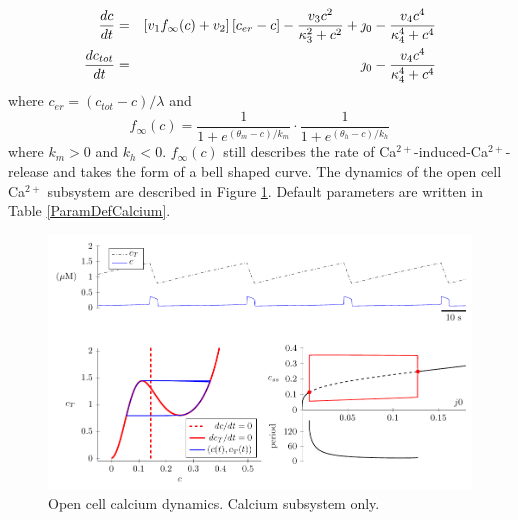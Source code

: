 \documentclass[12pt]{article}
\def\ca{Ca$^{2+}$\xspace}
\def\ctot{c_{tot}}
\def\cer{c_{er}}
\def\finf{f_\infty}
\def\thetam{\theta_m}
\def\km{k_m}
\def\thetah{\theta_h}
\def\kh{k_h}
\begin{document}
\begin{eqnarray*}
  \ddt{c} &=&  \left[ v_1 \finf(c) + v_2 \right] [\cer - c ] - \frac{v_3 c^2 }{\kappa_3^2 + c^2} + \jmath_0    -  \frac{v_4 c^4}{\kappa_4^4+c^4} \\
 \ddt{\ctot} &=& \jmath_0  -   \frac{v_4 c^4}{\kappa_4^4+c^4}
\end{eqnarray*}
where  $\cer = (\ctot-c)/\lambda$ and 
\begin{equation}
\finf(c) =  \frac{1}{1+e^{(\thetam-c)/\km}} \cdot  \frac{1}{1+e^{(\thetah-c)/\kh}}  \nonumber 
\end{equation}
where $\km>0$ and $\kh<0$. $f_\infty(c)$ still describes the rate of \ca-induced-\ca-release and takes the form of a bell shaped curve. The dynamics of the open cell \ca subsystem are described in Figure \ref{opencamodel}. Default parameters are written in Table \ref{ParamDefCalcium}.

\begin{figure}[h!]
    \centering
    \includegraphics{Fig03CalciumOpenCellModel.pdf}
    \caption{Open cell calcium dynamics. Calcium subsystem only.}
    \label{opencamodel}
\end{figure}
\end{document}
